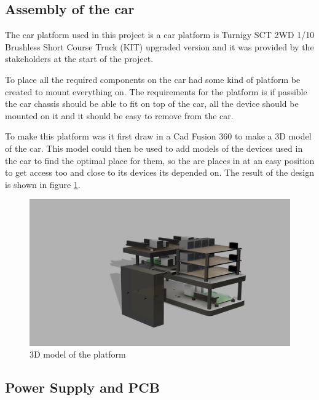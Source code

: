 \documentclass[11pt, titlepage]{article} %
\begin{document}


\subsection{Assembly of the car}

The car platform used in this project is a car platform is Turnigy SCT 2WD 1/10 Brushless Short Course Truck (KIT) upgraded version and it was provided by the stakeholders at the start of the project. 

To place all the required components on the car had some kind of platform be created to mount everything on. The requirements for the platform is if passible the car chassis should be able to fit on top of the car, all the device should be mounted on it and it should be easy to remove from the car. 

To make this platform was it first draw in a Cad Fusion 360 to make a 3D model of the car. This model could then be used to add models of the devices used in the car to find the optimal place for them, so the are places in at an easy position to get access too and close to its devices its depended on. The result of the design is shown in figure \ref{fig:3d_platform}. 

\begin{figure}
	\includegraphics{platform.png}
	\caption{3D model of the platform}
	\label{fig:3d_platform}
\end{figure}

\subsection{Power Supply and PCB}
\end{document}
